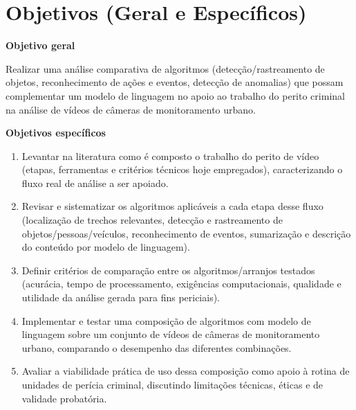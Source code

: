 \section*{Objetivos (Geral e Específicos)}

\textbf{Objetivo geral}

Realizar uma análise comparativa de algoritmos (detecção/rastreamento de objetos, reconhecimento de ações e eventos, detecção de anomalias) que possam complementar um modelo de linguagem no apoio ao trabalho do perito criminal na análise de vídeos de câmeras de monitoramento urbano.

\textbf{Objetivos específicos}

\begin{enumerate}[leftmargin=1.5em]
    \item Levantar na literatura como é composto o trabalho do perito de vídeo (etapas, ferramentas e critérios técnicos hoje empregados), caracterizando o fluxo real de análise a ser apoiado.
    \item Revisar e sistematizar os algoritmos aplicáveis a cada etapa desse fluxo (localização de trechos relevantes, detecção e rastreamento de objetos/pessoas/veículos, reconhecimento de eventos, sumarização e descrição do conteúdo por modelo de linguagem).
    \item Definir critérios de comparação entre os algoritmos/arranjos testados (acurácia, tempo de processamento, exigências computacionais, qualidade e utilidade da análise gerada para fins periciais).
    \item Implementar e testar uma composição de algoritmos com modelo de linguagem sobre um conjunto de vídeos de câmeras de monitoramento urbano, comparando o desempenho das diferentes combinações.
    \item Avaliar a viabilidade prática de uso dessa composição como apoio à rotina de unidades de perícia criminal, discutindo limitações técnicas, éticas e de validade probatória.
\end{enumerate}
